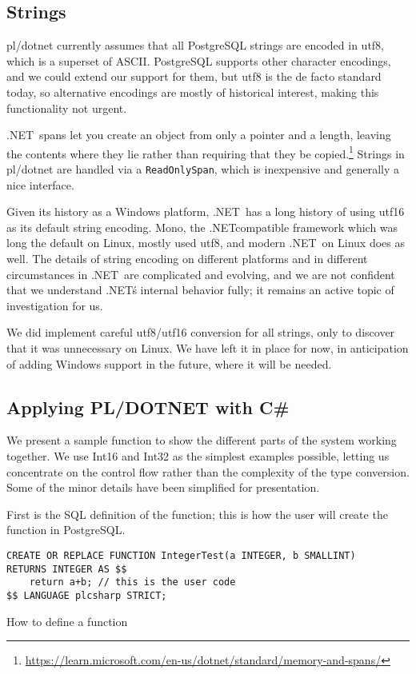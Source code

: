 \documentclass[sigconf,techreport,authorversion,nonacm]{acmart}
\newcommand{\dotnet}{.NET}
\begin{document}
\subsection{Strings}

pl/dotnet currently assumes that all PostgreSQL strings are encoded
in utf8, which is a superset of ASCII.  PostgreSQL supports other
character encodings, and we could extend our support for them, but
utf8 is the de facto standard today, so alternative encodings are
mostly of historical interest, making this functionality not urgent.

\dotnet\ spans let you create an object from only a pointer and a
length, leaving the contents where they lie rather than requiring
that they be copied.\footnote{\url{https://learn.microsoft.com/en-us/dotnet/standard/memory-and-spans/}}
Strings in pl/dotnet are handled via a \texttt{ReadOnlySpan}, which is
inexpensive and generally a nice interface.

Given its history as a Windows platform, \dotnet\ has a long history
of using utf16 as its default string encoding.  Mono, the
\dotnet\-compatible framework which was long the default on Linux,
mostly used utf8, and modern \dotnet\ on Linux does as well.  The
details of string encoding on different platforms and in different
circumstances in \dotnet\ are complicated and evolving, and we are
not confident that we understand \dotnet\'s internal behavior fully;
it remains an active topic of investigation for us.

We did implement careful utf8/utf16 conversion for all strings,
only to discover that it was unnecessary on Linux.  We have left
it in place for now, in anticipation of adding Windows support in
the future, where it will be needed.

\subsection{Applying PL/DOTNET with C\#}

We present a sample function to show the different parts of
the system working together.  We use Int16 and Int32 as the simplest
examples possible, letting us concentrate on the control flow
rather than the complexity of the type conversion.  Some of the
minor details have been simplified for presentation.

First is the SQL definition of the function; this is how the user
will create the function in PostgreSQL.

\begin{listing}[H]
\begin{verbatim}
CREATE OR REPLACE FUNCTION IntegerTest(a INTEGER, b SMALLINT)
RETURNS INTEGER AS $$
    return a+b; // this is the user code
$$ LANGUAGE plcsharp STRICT;
\end{verbatim}
\caption{How to define a function}
\end{listing}
\end{document}
